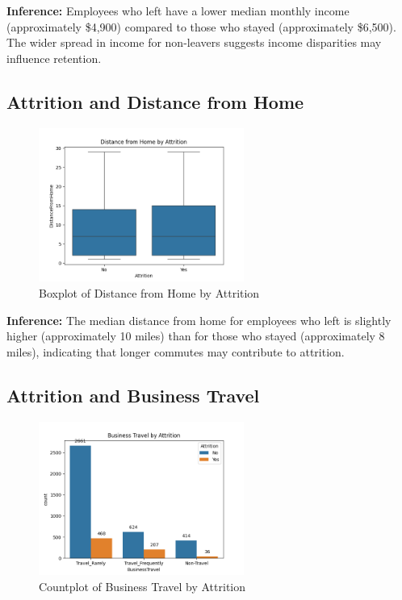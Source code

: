 \documentclass[12pt, a4paper]{article}
\begin{document}
\textbf{Inference:} Employees who left have a lower median monthly income (approximately \$4,900) compared to those who stayed (approximately \$6,500). The wider spread in income for non-leavers suggests income disparities may influence retention.

\subsection{Attrition and Distance from Home}
\begin{figure}[H]
    \centering
    \includegraphics[width=0.6\textwidth]{plots/attrition_distance_boxplot.png}
    \caption{Boxplot of Distance from Home by Attrition}
    \label{fig:attrition_distance}
\end{figure}

\textbf{Inference:} The median distance from home for employees who left is slightly higher (approximately 10 miles) than for those who stayed (approximately 8 miles), indicating that longer commutes may contribute to attrition.

\subsection{Attrition and Business Travel}
\begin{figure}[H]
    \centering
    \includegraphics[width=0.6\textwidth]{plots/attrition_businesstravel_countplot.png}
    \caption{Countplot of Business Travel by Attrition}
    \label{fig:attrition_businesstravel}
\end{figure}
\end{document}
